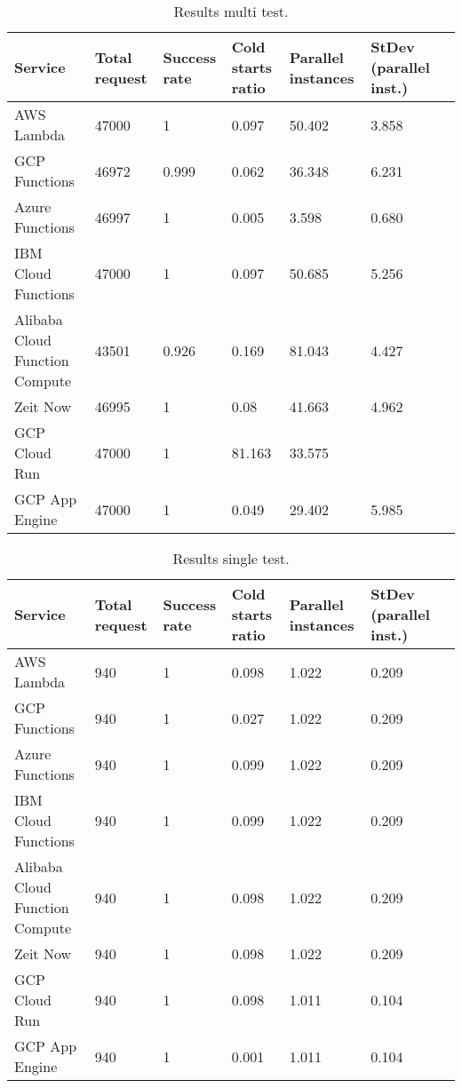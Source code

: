 \documentclass[11pt]{article}
\begin{document}
\begin{table}
\centering
 \begin{tabularx}{1\textwidth}{p{4cm} X X X X X X}
 \textbf{Service} & \textbf{Total request} & \textbf{Success rate} & \textbf{Cold starts ratio} & \textbf{Parallel instances} & \textbf{StDev (parallel inst.)} \\
 \hline
 \hline
 AWS Lambda & 47000 & 1 & 0.097 & 50.402 & 3.858\\
 \hline
 GCP Functions & 46972 & 0.999 & 0.062 & 36.348 & 6.231\\
 \hline
 Azure Functions & 46997 & 1 & 0.005 & 3.598 & 0.680\\
 \hline
 IBM Cloud Functions & 47000 & 1 & 0.097 & 50.685 & 5.256\\
 \hline
 Alibaba Cloud Function Compute & 43501 & 0.926 & 0.169 & 81.043 & 4.427\\
 \hline
 Zeit Now & 46995  & 1 & 0.08 & 41.663 & 4.962\\
 \hline
 GCP Cloud Run & 47000 & 1 & 81.163 & 33.575\\
 \hline
 GCP App Engine & 47000 & 1 & 0.049 & 29.402 & 5.985\\
 \hline

\end{tabularx}
\caption{Results multi test.}
\label{Tab:multi}
\end{table}


\begin{table}
\centering
 \begin{tabularx}{1\textwidth}{p{4cm} X X X X X X}
 \textbf{Service} & \textbf{Total request} & \textbf{Success rate} & \textbf{Cold starts ratio} & \textbf{Parallel instances} & \textbf{StDev (parallel inst.)} \\
 \hline
 \hline
 AWS Lambda & 940 & 1 & 0.098 & 1.022 & 0.209\\
 \hline
 GCP Functions & 940 & 1 & 0.027 & 1.022 & 0.209\\
 \hline
 Azure Functions & 940 & 1 & 0.099 & 1.022 & 0.209\\
 \hline
 IBM Cloud Functions & 940 & 1 & 0.099 & 1.022 & 0.209\\
 \hline
 Alibaba Cloud Function Compute & 940 & 1 & 0.098 & 1.022 & 0.209\\
 \hline
 Zeit Now & 940 & 1 & 0.098 & 1.022 & 0.209\\
 \hline
 GCP Cloud Run & 940 & 1 & 0.098 & 1.011 & 0.104\\
 \hline
 GCP App Engine & 940 & 1 & 0.001 & 1.011 & 0.104\\
 \hline

\end{tabularx}
\caption{Results single test.}
\label{Tab:single}
\end{table}
\end{document}
